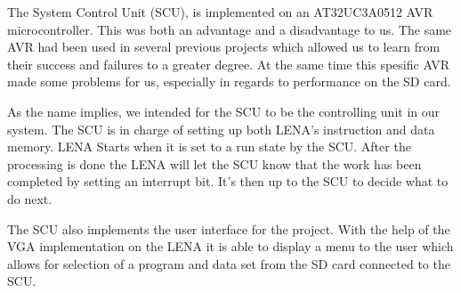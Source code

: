 The System Control Unit (SCU), is implemented on an AT32UC3A0512 AVR microcontroller. This was both an advantage and a disadvantage to us. The same AVR had been used in several previous projects which allowed us to learn from their success and failures to a greater degree. At the same time this spesific AVR made some problems for us, especially in regards to performance on the SD card. 

\begin{comment}
Denna prosess tingen hører ikke hjemme under 'introduction'

When we first started working on the SCU we focused mostly on the hardware mappings as this was needed for the PCB to be delivered. We made sure to make it as similar as possible to the EVK1100 test card which we had avaliable. This made it possible for us to begin writing and testing some of our code before the PCB arrived. Having completed this we were able to start thinking about the code and to define what we figured we would need in terms of functions and headers for our application. Granted this was not set in stone as much of the design was yet to be determined, but it gave us a starting point to which we were able to work and improve upon.
\end{comment}

As the name implies, we intended for the SCU to be the controlling unit in our system. The SCU is in charge of setting up both LENA's instruction and data memory. LENA Starts when it is set to a run state by the SCU. After the processing is done the LENA will let the SCU know that the work has been completed by setting an interrupt bit. It's then up to the SCU to decide what to do next. 

The SCU also implements the user interface for the project. With the help of the VGA implementation on the LENA it is able to display a menu to the user which allows for selection of a program and data set from the SD card connected to the SCU.
